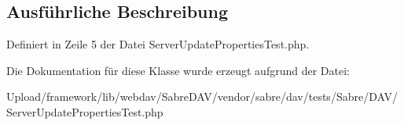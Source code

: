 \subsection{Ausführliche Beschreibung}


Definiert in Zeile 5 der Datei Server\+Update\+Properties\+Test.\+php.



Die Dokumentation für diese Klasse wurde erzeugt aufgrund der Datei\+:\begin{DoxyCompactItemize}
\item 
Upload/framework/lib/webdav/\+Sabre\+D\+A\+V/vendor/sabre/dav/tests/\+Sabre/\+D\+A\+V/Server\+Update\+Properties\+Test.\+php\end{DoxyCompactItemize}
